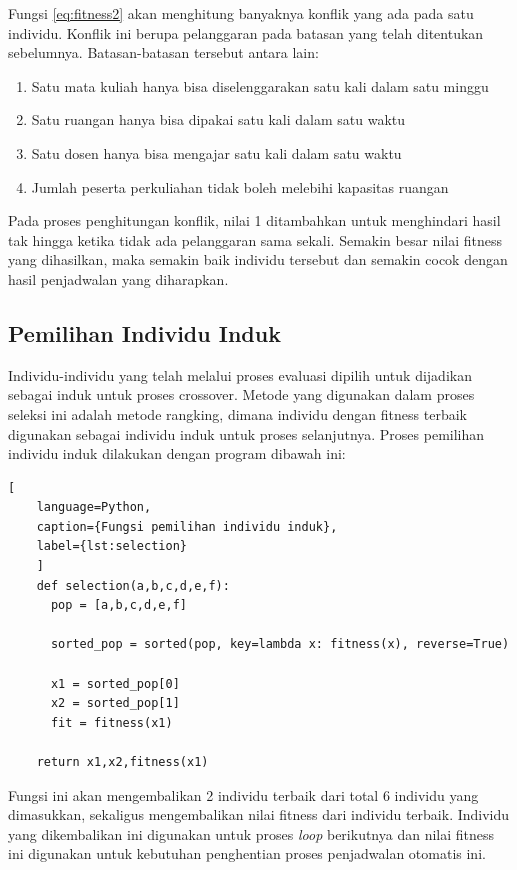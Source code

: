   Fungsi \ref{eq:fitness2} akan menghitung banyaknya konflik yang ada pada satu individu. Konflik ini berupa pelanggaran pada batasan yang telah ditentukan sebelumnya.
  Batasan-batasan tersebut antara lain:
  \begin{enumerate}[nolistsep]
    \item Satu mata kuliah hanya bisa diselenggarakan satu kali dalam satu minggu
    \item Satu ruangan hanya bisa dipakai satu kali dalam satu waktu
    \item Satu dosen hanya bisa mengajar satu kali dalam satu waktu
    \item Jumlah peserta perkuliahan tidak boleh melebihi kapasitas ruangan
  \end{enumerate} 
 Pada proses penghitungan konflik, nilai 1 ditambahkan untuk menghindari hasil tak hingga ketika tidak ada pelanggaran sama sekali. 
 Semakin besar nilai fitness yang dihasilkan, maka semakin baik individu tersebut dan semakin cocok dengan hasil penjadwalan yang diharapkan. 
\subsection{Pemilihan Individu Induk}
  
  Individu-individu yang telah melalui proses evaluasi dipilih untuk dijadikan sebagai \linebreak induk untuk proses crossover.
  Metode yang digunakan dalam proses seleksi ini adalah metode \linebreak rangking, dimana individu dengan fitness terbaik digunakan sebagai individu induk untuk proses selanjutnya. 
  Proses pemilihan individu induk dilakukan dengan program dibawah ini:
  \begin{lstlisting}[
    language=Python,
    caption={Fungsi pemilihan individu induk},
    label={lst:selection}
    ]
    def selection(a,b,c,d,e,f):
      pop = [a,b,c,d,e,f]

      sorted_pop = sorted(pop, key=lambda x: fitness(x), reverse=True)
      
      x1 = sorted_pop[0]
      x2 = sorted_pop[1]
      fit = fitness(x1)

    return x1,x2,fitness(x1)
  \end{lstlisting}
  Fungsi ini akan mengembalikan 2 individu terbaik dari total 6 individu yang dimasukkan, sekaligus mengembalikan nilai fitness dari individu terbaik. 
  Individu yang dikembalikan ini digunakan untuk proses \emph{loop} berikutnya dan nilai fitness ini digunakan untuk kebutuhan penghentian proses penjadwalan otomatis ini.
